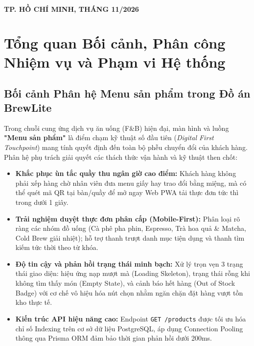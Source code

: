 \documentclass[a4paper]{article}
\begin{document}
\begin{titlepage}
\begin{singlespace}
\vfill
\begin{center}
{\small \textbf{TP. HỒ CHÍ MINH, THÁNG 11/2026}}
\end{center}
\end{singlespace}
\end{titlepage}

\thispagestyle{empty}
\newpage

\tableofcontents
\newpage

\onehalfspacing

\section{Tổng quan Bối cảnh, Phân công Nhiệm vụ và Phạm vi Hệ thống}

\subsection{Bối cảnh Phân hệ Menu sản phẩm trong Đồ án BrewLite}
Trong chuỗi cung ứng dịch vụ ăn uống (F\&B) hiện đại, màn hình và luồng \textbf{"Menu sản phẩm"} là điểm chạm kỹ thuật số đầu tiên (\textit{Digital First Touchpoint}) mang tính quyết định đến toàn bộ phễu chuyển đổi của khách hàng. Phân hệ phụ trách giải quyết các thách thức vận hành và kỹ thuật then chốt:
\begin{itemize}
    \item \textbf{Khắc phục ùn tắc quầy thu ngân giờ cao điểm:} Khách hàng không phải xếp hàng chờ nhân viên đưa menu giấy hay trao đổi bằng miệng, mà có thể quét mã QR tại bàn/quầy để mở ngay Web PWA tải thực đơn tức thì trong dưới 1 giây.
    \item \textbf{Trải nghiệm duyệt thực đơn phân cấp (Mobile-First):} Phân loại rõ ràng các nhóm đồ uống (Cà phê pha phin, Espresso, Trà hoa quả \& Matcha, Cold Brew giải nhiệt); hỗ trợ thanh trượt danh mục tiện dụng và thanh tìm kiếm tức thời theo từ khóa.
    \item \textbf{Độ tin cậy và phản hồi trạng thái minh bạch:} Xử lý trọn vẹn 3 trạng thái giao diện: hiệu ứng nạp mượt mà (Loading Skeleton), trạng thái rỗng khi không tìm thấy món (Empty State), và cảnh báo hết hàng (Out of Stock Badge) với cơ chế vô hiệu hóa nút chọn nhằm ngăn chặn đặt hàng vượt tồn kho thực tế.
    \item \textbf{Kiến trúc API hiệu năng cao:} Endpoint \texttt{GET /products} được tối ưu hóa chỉ số Indexing trên cơ sở dữ liệu PostgreSQL, áp dụng Connection Pooling thông qua Prisma ORM đảm bảo thời gian phản hồi dưới 200ms.
\end{itemize}
\end{document}
